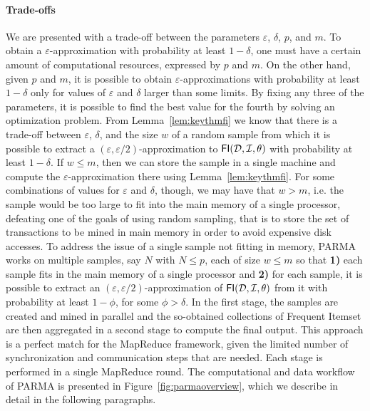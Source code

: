 \paragraph*{Trade-offs} We are presented with a trade-off between the parameters
$\varepsilon$, $\delta$, $p$, and $m$. To obtain a $\varepsilon$-approximation
with probability at least $1-\delta$, one must have a certain amount of computational resources,
expressed by $p$ and $m$. On the other hand, given $p$ and $m$, it is possible
to obtain $\varepsilon$-approximations with probability at least
$1-\delta$ only for values of $\varepsilon$ and $\delta$ larger than some
limits. By fixing any three of the parameters, it is possible to find the
best value for the fourth by solving an optimization problem. From
Lemma~\ref{lem:keythmfi} we know that there is a trade-off between
$\varepsilon$, $\delta$, and the size $w$ of a random sample from which it is
possible to extract a $(\varepsilon,\varepsilon/2)$-approximation to
$\mathsf{FI}({\cal D},{\cal I},\theta)$ with probability at least $1-\delta$. If $w\le m$, then
we can store the sample in a single machine and compute the
$\varepsilon$-approximation there using Lemma~\ref{lem:keythmfi}. For some
combinations of values for $\varepsilon$ and $\delta$, though, we may have that
$w>m$, i.e. the sample would be too large to fit into the main memory of a single
processor, defeating one of the goals of using random sampling, that is to store
the set of transactions to be mined in main memory in order to avoid expensive disk
accesses. To address the issue of a single sample not fitting in memory, PARMA
works on multiple samples, say $N$ with $N\le p$, each of size $w\le m$ so that
{\bf 1)} each sample fits in the main memory of a single processor and {\bf 2)}
for each sample, it is possible to extract an
$(\varepsilon,\varepsilon/2)$-approximation of $\mathsf{FI}({\cal D},{\cal I},\theta)$ from it
with probability at least $1-\phi$, for some $\phi>\delta$. In the first stage,
the samples are created and mined in parallel and the so-obtained collections of
Frequent Itemset are then aggregated in a second stage to compute the final output. This
approach is a perfect match for the MapReduce framework, given the limited
number of synchronization and
communication steps that are needed. Each
stage is performed in a single MapReduce round. The computational and data
workflow of PARMA is presented in Figure~\ref{fig:parmaoverview}, which we
describe in detail in the following paragraphs.

